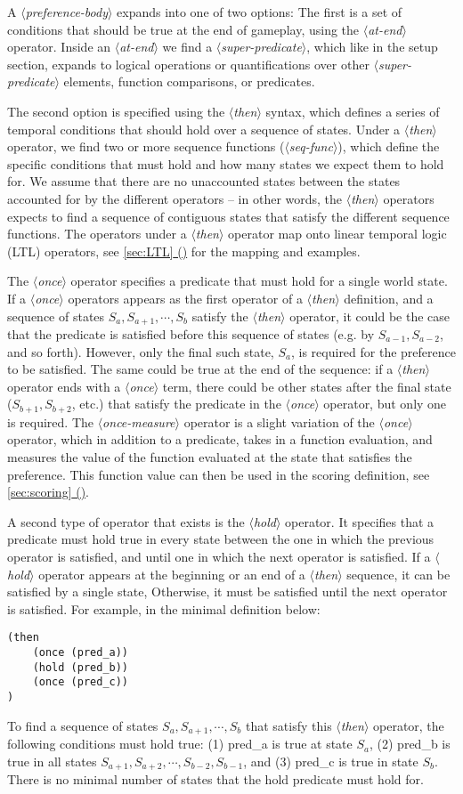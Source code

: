 \documentclass{article}
\newcommand{\dsl}[1]{{\it $\langle$#1$\rangle$}}
\newcommand*{\fullref}[1]{\hyperref[{#1}]{\autoref*{#1} (\nameref*{#1})}} %
\begin{document}
A \dsl{preference-body} expands into one of two options:
The first is a set of conditions that should be true at the end of gameplay, using the \dsl{at-end} operator.
Inside an \dsl{at-end} we find a \dsl{super-predicate}, which like in the setup section, expands to logical operations or quantifications over other \dsl{super-predicate} elements, function comparisons, or predicates.

The second option is specified using the \dsl{then} syntax, which defines a series of temporal conditions that should hold over a sequence of states.
Under a \dsl{then} operator, we find two or more sequence functions (\dsl{seq-func}), which define the specific conditions that must hold and how many states we expect them to hold for.
We assume that there are no unaccounted states between the states accounted for by the different operators -- in other words, the \dsl{then} operators expects to find a sequence of contiguous states that satisfy the different sequence functions.
The operators under a \dsl{then} operator map onto linear temporal logic (LTL) operators, see \fullref{sec:LTL} for the mapping and examples.

The \dsl{once} operator specifies a predicate that must hold for a single world state.
If a \dsl{once} operators appears as the first operator of a \dsl{then} definition, and a sequence of states $S_a, S_{a+1}, \cdots, S_b$ satisfy the \dsl{then} operator, it could be the case that the predicate is satisfied before this sequence of states (e.g. by $S_{a-1}, S_{a-2}$, and so forth).
However, only the final such state, $S_a$, is required for the preference to be satisfied.
The same could be true at the end of the sequence: if a \dsl{then} operator ends with a \dsl{once} term, there could be other states after the final state ($S_{b+1}, S_{b+2}$, etc.) that satisfy the predicate in the \dsl{once} operator, but only one is required.
The \dsl{once-measure} operator is a slight variation of the \dsl{once} operator, which in addition to a predicate, takes in a function evaluation, and measures the value of the function evaluated at the state that satisfies the preference.
This function value can then be used in the scoring definition, see \fullref{sec:scoring}.

A second type of operator that exists is the \dsl{hold} operator.
It specifies that a predicate must hold true in every state between the one in which the previous operator is satisfied, and until one in which the next operator is satisfied.
If a \dsl{hold} operator appears at the beginning or an end of a \dsl{then} sequence, it can be satisfied by a single state,
Otherwise, it must be satisfied until the next operator is satisfied.
For example, in the minimal definition below:
\begin{lstlisting}
(then
    (once (pred_a))
    (hold (pred_b))
    (once (pred_c))
)
\end{lstlisting}
To find a sequence of states $S_a, S_{a+1}, \cdots, S_b$ that satisfy this \dsl{then} operator, the following conditions must hold true: (1) pred_a is true at state $S_a$, (2) pred_b is true in all states $S_{a+1}, S_{a+2}, \cdots, S_{b-2}, S_{b-1}$, and (3) pred_c is true in state $S_b$.
There is no minimal number of states that the hold predicate must hold for.
\end{document}
